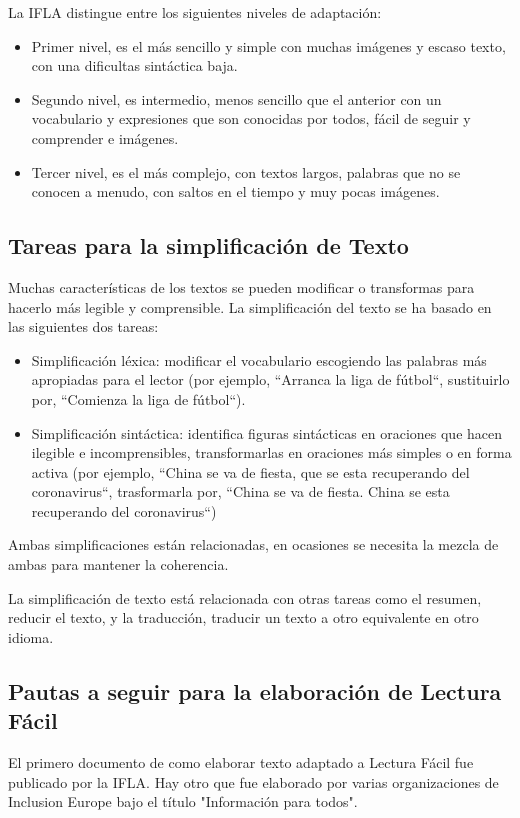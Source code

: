 La IFLA distingue entre los siguientes niveles de adaptación:
\begin{itemize}
	\item Primer nivel, es el más sencillo y simple con muchas imágenes y escaso texto, con una dificultas sintáctica baja.
\item Segundo nivel, es intermedio, menos sencillo que el anterior con un vocabulario y expresiones que son conocidas por todos, fácil de seguir y comprender e imágenes.
\item Tercer nivel, es el más complejo, con textos largos, palabras que no se conocen a menudo, con saltos en el tiempo y muy pocas imágenes. 
 \end{itemize}

\subsection{Tareas para la simplificación de Texto}
Muchas características de los textos se pueden modificar o transformas para hacerlo más legible y comprensible.\cite{}
La simplificación del texto se ha basado en las siguientes dos tareas: 
 \begin{itemize}
 	\item Simplificación léxica: modificar el vocabulario escogiendo las palabras más apropiadas para el lector (por ejemplo, ``Arranca la liga de fútbol``, sustituirlo por, ``Comienza la liga de fútbol``).
 	\item Simplificación sintáctica: identifica figuras sintácticas en oraciones que hacen ilegible e incomprensibles, transformarlas en oraciones más simples o en forma activa (por ejemplo, ``China se va de fiesta, que se esta recuperando del coronavirus``, trasformarla por, ``China se va de fiesta. China se esta recuperando del coronavirus``) 
 	\end{itemize}
 Ambas simplificaciones están relacionadas, en ocasiones se necesita la mezcla de ambas para mantener la coherencia.
 
  \setlength{\parskip}{10pt}
  
 La simplificación de texto está relacionada con otras tareas como el resumen, reducir el texto, y la traducción, traducir un texto a otro equivalente en otro idioma. 


\subsection{Pautas a seguir para la elaboración de Lectura Fácil}
 El primero documento de como elaborar texto adaptado a Lectura Fácil fue publicado por la IFLA. Hay otro que fue elaborado por varias organizaciones de Inclusion Europe bajo el título "Información para todos".
 
